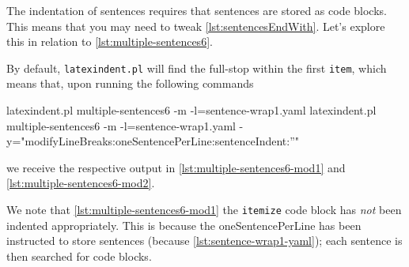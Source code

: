  \begin{example}
 The indentation of sentences requires that sentences are stored as code blocks. This
 means that you may need to tweak \vref{lst:sentencesEndWith}. Let's explore this in
 relation to \cref{lst:multiple-sentences6}.


 By default, \texttt{latexindent.pl} will find the full-stop within the first
 \texttt{item}, which means that, upon running the following commands   

 \begin{commandshell}
latexindent.pl multiple-sentences6 -m -l=sentence-wrap1.yaml 
latexindent.pl multiple-sentences6 -m -l=sentence-wrap1.yaml -y="modifyLineBreaks:oneSentencePerLine:sentenceIndent:''"
\end{commandshell}

 we receive the respective output in \cref{lst:multiple-sentences6-mod1} and
 \cref{lst:multiple-sentences6-mod2}.



 We note that \cref{lst:multiple-sentences6-mod1} the \texttt{itemize} code block has
 \emph{not} been indented appropriately. This is because the oneSentencePerLine has been
 instructed to store sentences (because \cref{lst:sentence-wrap1-yaml}); each sentence is
 then searched for code blocks.
 \end{example}

